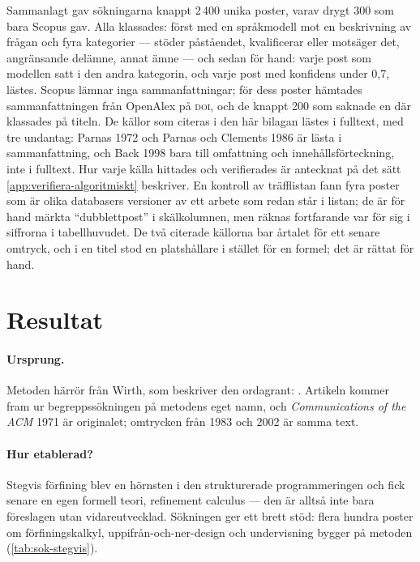 Sammanlagt gav sökningarna knappt 2\,400 unika poster, varav drygt 300
som bara Scopus gav.  Alla klassades:
först med en språkmodell mot en beskrivning av frågan och fyra
kategorier --- stöder påståendet, kvalificerar eller motsäger det,
angränsande delämne, annat ämne --- och sedan för hand: varje post som
modellen satt i den andra kategorin, och varje post med konfidens under
0,7, lästes.  Scopus lämnar inga sammanfattningar; för dess poster
hämtades sammanfattningen från OpenAlex på \textsc{doi}, och de knappt
200 som saknade en där klassades på titeln.  De källor som citeras i den här bilagan lästes i fulltext,
med tre undantag: Parnas 1972 och Parnas och Clements 1986 är lästa i
sammanfattning, och Back 1998 bara till omfattning och innehållsförteckning,
inte i fulltext.  Hur varje källa hittades och verifierades är antecknat på det sätt
\cref{app:verifiera-algoritmiskt} beskriver.  En kontroll av träfflistan
fann fyra poster som är olika databasers versioner av ett arbete som redan
står i listan; de är för hand märkta \enquote{dubblettpost} i
skälkolumnen, men räknas fortfarande var för sig i siffrorna i
tabellhuvudet.  De två citerade källorna bar årtalet för ett senare
omtryck, och i en titel stod en platshållare i stället för en formel; det
är rättat för hand.

\section{Resultat}
\label{sec:stegvis-resultat}

\paragraph{Ursprung.}  Metoden härrör från Wirth, som beskriver den
ordagrant: .  Artikeln kommer fram ur begreppssökningen på metodens
eget namn, och \emph{Communications of the ACM} 1971 är originalet;
omtrycken från 1983 och 2002 är samma text.

\paragraph{Hur etablerad?}  Stegvis förfining blev en hörnsten i den
strukturerade programmeringen och fick senare en egen formell teori,
\foreignlanguage{english}{refinement
calculus}\autocite{back1998refinement} --- den är alltså inte bara
föreslagen utan vidareutvecklad.  Sökningen ger ett brett stöd: flera
hundra poster om förfiningskalkyl, uppifrån-och-ner-design och
undervisning bygger på metoden (\cref{tab:sok-stegvis}).


